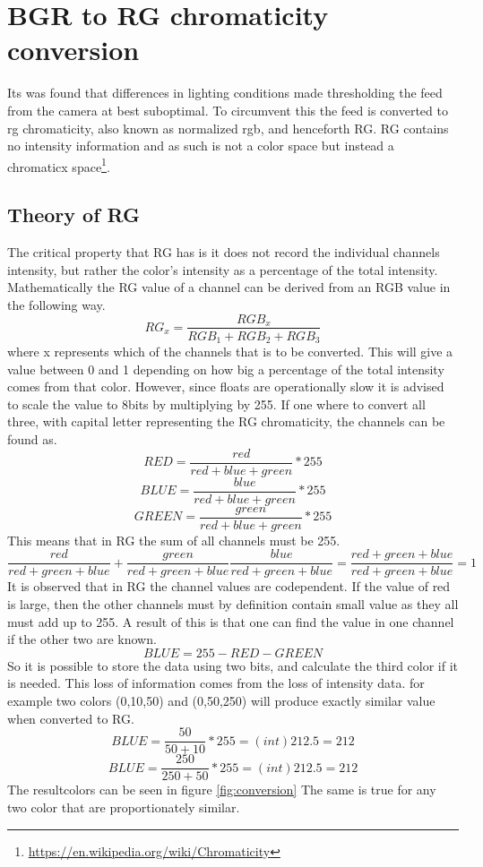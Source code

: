\section{BGR to RG chromaticity conversion}
Its was found that differences in lighting conditions made thresholding the feed from the camera at best suboptimal. To circumvent this the feed is converted to rg chromaticity, also known as normalized rgb, and henceforth RG. RG contains no intensity information and as such is not a color space but instead a chromaticx  space\footnote{\url{https://en.wikipedia.org/wiki/Chromaticity}}.
\subsection{Theory of RG} 
The critical property that RG has is it does not record the individual channels intensity, but rather the color's intensity as a percentage of the total intensity. Mathematically the RG value of a channel can be derived from an RGB value in the following way.
\[ RG_x = \frac{RGB_x}{RGB_1 + RGB_2 + RGB_3}\]
where x represents which of the channels that is to be converted. This will give a value between 0 and 1 depending on how big a percentage of the total intensity comes from that color. However, since floats are operationally slow it is advised to scale the value to 8bits by multiplying by 255. If one where to convert all three, with capital letter representing the RG chromaticity, the channels can be found as.
\[ RED = \frac{red}{red + blue + green} * 255\]
\[ BLUE = \frac{blue}{red + blue + green} * 255\]
\[ GREEN = \frac{green}{red + blue + green} * 255\]
This means that in RG the sum of all channels must be 255.
\[ \frac{red}{red + green + blue} + \frac{green}{red + green + blue} \frac{blue}{red + green + blue} =  \frac{red + green + blue}{red + green + blue} = 1\]
It is observed that in RG the channel values are codependent. If the value of red is large, then the other channels must by definition contain small value as they all must add up to 255. A result of this is that one can find the value in one channel if the other two are known.
\[ BLUE = 255 - RED - GREEN\]
So it is possible to store the data using two bits, and calculate the third color if it is needed. This loss of information comes from the loss of intensity data\cite{NormRGB}. for example two colors (0,10,50) and (0,50,250) will produce exactly similar value when converted to RG. 
\[ BLUE = \frac{50}{50 + 10} * 255 = (int)212.5 = 212 \]
\[ BLUE = \frac{250}{250 + 50} * 255 = (int)212.5 = 212 \]
The resultcolors can be seen in figure \ref{fig:conversion} The same is true for any two color that are proportionately similar.\\
